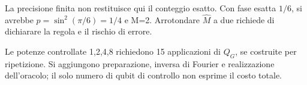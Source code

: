 
La precisione finita non restituisce qui il conteggio esatto. Con fase esatta \(1/6\), si avrebbe \(p=\sin^2(\pi/6)=1/4\) e M=2. Arrotondare \(\widehat M\) a due richiede di dichiarare la regola e il rischio di errore.


Le potenze controllate 1,2,4,8 richiedono 15 applicazioni di \(Q_G\), se costruite per ripetizione. Si aggiungono preparazione, inversa di Fourier e realizzazione dell’oracolo; il solo numero di qubit di controllo non esprime il costo totale.

